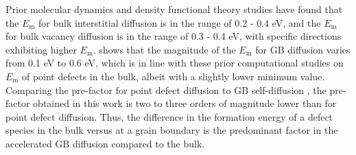 \documentclass[review]{elsarticle}
\begin{document}
Prior molecular dynamics \cite{WANG2023154289} and density functional theory \cite{wirth2011} studies have found that the $E_{\mathrm{m}}$ for bulk interstitial diffusion is in the range of 0.2 - 0.4 eV, and the $E_{\mathrm{m}}$ for bulk vacancy diffusion is in the range of 0.3 - 0.4 eV, with specific directions exhibiting higher $E_{\mathrm{m}}$.  shows that the magnitude of the $E_{\mathrm{m}}$ for GB diffusion varies from 0.1 eV to 0.6 eV, which is in line with these prior computational studies on $E_{\mathrm{m}}$ of point defects in the bulk, albeit with a slightly lower minimum value. Comparing the pre-factor for point defect diffusion to GB self-diffusion \cite{WANG2023154289}, the pre-factor obtained in this work is two to three orders of magnitude lower than for point defect diffusion. Thus, the difference in the formation energy of a defect species in the bulk versus at a grain boundary is the predominant factor in the accelerated GB diffusion compared to the bulk.


\end{document}
